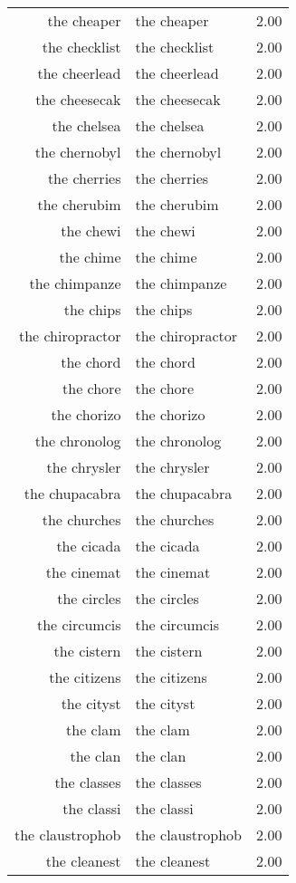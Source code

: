 \begin{table}[ht]
\begin{tabular}{rlr}
  the cheaper & the cheaper & 2.00 \\ 
  the checklist & the checklist & 2.00 \\ 
  the cheerlead & the cheerlead & 2.00 \\ 
  the cheesecak & the cheesecak & 2.00 \\ 
  the chelsea & the chelsea & 2.00 \\ 
  the chernobyl & the chernobyl & 2.00 \\ 
  the cherries & the cherries & 2.00 \\ 
  the cherubim & the cherubim & 2.00 \\ 
  the chewi & the chewi & 2.00 \\ 
  the chime & the chime & 2.00 \\ 
  the chimpanze & the chimpanze & 2.00 \\ 
  the chips & the chips & 2.00 \\ 
  the chiropractor & the chiropractor & 2.00 \\ 
  the chord & the chord & 2.00 \\ 
  the chore & the chore & 2.00 \\ 
  the chorizo & the chorizo & 2.00 \\ 
  the chronolog & the chronolog & 2.00 \\ 
  the chrysler & the chrysler & 2.00 \\ 
  the chupacabra & the chupacabra & 2.00 \\ 
  the churches & the churches & 2.00 \\ 
  the cicada & the cicada & 2.00 \\ 
  the cinemat & the cinemat & 2.00 \\ 
  the circles & the circles & 2.00 \\ 
  the circumcis & the circumcis & 2.00 \\ 
  the cistern & the cistern & 2.00 \\ 
  the citizens & the citizens & 2.00 \\ 
  the cityst & the cityst & 2.00 \\ 
  the clam & the clam & 2.00 \\ 
  the clan & the clan & 2.00 \\ 
  the classes & the classes & 2.00 \\ 
  the classi & the classi & 2.00 \\ 
  the claustrophob & the claustrophob & 2.00 \\ 
  the cleanest & the cleanest & 2.00 \\ 

\end{tabular}
\end{table}
